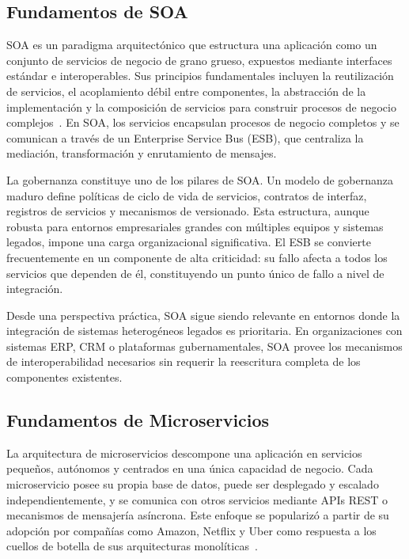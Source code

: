 \documentclass[10pt,twocolumn,letterpaper]{article}
\begin{document}
\subsection{Fundamentos de SOA}

SOA es un paradigma arquitectónico que estructura una aplicación como un conjunto de servicios de negocio de grano grueso, expuestos mediante interfaces estándar e interoperables. Sus principios fundamentales incluyen la reutilización de servicios, el acoplamiento débil entre componentes, la abstracción de la implementación y la composición de servicios para construir procesos de negocio complejos~\cite{b2}. En SOA, los servicios encapsulan procesos de negocio completos y se comunican a través de un Enterprise Service Bus (ESB), que centraliza la mediación, transformación y enrutamiento de mensajes.

La gobernanza constituye uno de los pilares de SOA. Un modelo de gobernanza maduro define políticas de ciclo de vida de servicios, contratos de interfaz, registros de servicios y mecanismos de versionado. Esta estructura, aunque robusta para entornos empresariales grandes con múltiples equipos y sistemas legados, impone una carga organizacional significativa. El ESB se convierte frecuentemente en un componente de alta criticidad: su fallo afecta a todos los servicios que dependen de él, constituyendo un punto único de fallo a nivel de integración.

Desde una perspectiva práctica, SOA sigue siendo relevante en entornos donde la integración de sistemas heterogéneos legados es prioritaria. En organizaciones con sistemas ERP, CRM o plataformas gubernamentales, SOA provee los mecanismos de interoperabilidad necesarios sin requerir la reescritura completa de los componentes existentes.

\subsection{Fundamentos de Microservicios}

La arquitectura de microservicios descompone una aplicación en servicios pequeños, autónomos y centrados en una única capacidad de negocio. Cada microservicio posee su propia base de datos, puede ser desplegado y escalado independientemente, y se comunica con otros servicios mediante APIs REST o mecanismos de mensajería asíncrona. Este enfoque se popularizó a partir de su adopción por compañías como Amazon, Netflix y Uber como respuesta a los cuellos de botella de sus arquitecturas monolíticas~\cite{b1}.
\end{document}
